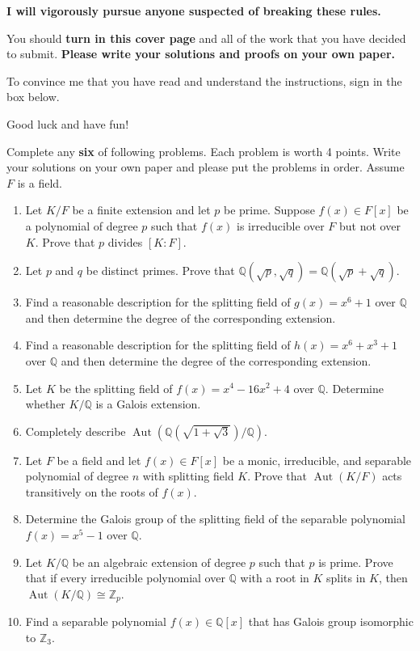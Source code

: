 \documentclass[11pt]{scrartcl}
\theoremstyle{definition}
\DeclareMathOperator{\Aut}{Aut}
\begin{document}
\begin{center}
\textbf{I will vigorously pursue anyone suspected of breaking these rules.}
\end{center}

\bigskip

You should \textbf{turn in this cover page} and all of the work that you have decided to submit. \textbf{Please write your solutions and proofs on your own paper.}

\bigskip

To convince me that you have read and understand the instructions, sign in the box below.

\bigskip


\bigskip

Good luck and have fun!

\newpage

Complete any \textbf{six} of following problems.  Each problem is worth 4 points. Write your solutions on your own paper and please put the problems in order. Assume $F$ is a field.

\begin{enumerate}
\item Let $K/F$ be a finite extension and let $p$ be prime. Suppose $f(x)\in F[x]$ be a polynomial of degree $p$ such that $f(x)$ is irreducible over $F$ but not over $K$. Prove that $p$ divides $[K:F]$.
\item Let $p$ and $q$ be distinct primes. Prove that $\mathbb{Q}(\sqrt{p},\sqrt{q})=\mathbb{Q}(\sqrt{p}+\sqrt{q})$.
\item Find a reasonable description for the splitting field of $g(x)=x^6+1$ over $\mathbb{Q}$ and then determine the degree of the corresponding extension.
\item Find a reasonable description for the splitting field of $h(x)=x^6+x^3+1$ over $\mathbb{Q}$ and then determine the degree of the corresponding extension.
\item Let $K$ be the splitting field of $f(x)=x^4-16x^2+4$ over $\mathbb{Q}$. Determine whether $K/\mathbb{Q}$ is a Galois extension.
\item Completely describe $\Aut(\mathbb{Q}(\sqrt{1+\sqrt{3}})/\mathbb{Q})$.
\item Let $F$ be a field and let $f(x)\in F[x]$ be a monic, irreducible, and separable polynomial of degree $n$ with splitting field $K$. Prove that $\Aut(K/F)$ acts transitively on the roots of $f(x)$.
\item Determine the Galois group of the splitting field of the separable polynomial $f(x)=x^5-1$ over $\mathbb{Q}$.
\item Let $K/\mathbb{Q}$ be an algebraic extension of degree $p$ such that $p$ is prime. Prove that if every irreducible polynomial over $\mathbb{Q}$ with a root in $K$ splits in $K$, then $\Aut(K/\mathbb{Q})\cong \mathbb{Z}_p$.
\item Find a separable polynomial $f(x)\in \mathbb{Q}[x]$ that has Galois group isomorphic to $\mathbb{Z}_3$.
\end{enumerate}
\end{document}

